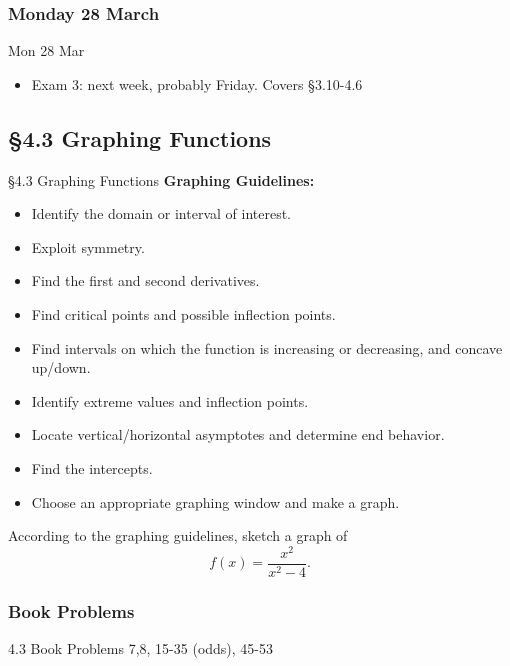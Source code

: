 \documentclass[cal1spr16Lectures.tex]{subfiles}
\begin{document}

\subsubsection{\bf Monday 28 March}

\begin{frame}[allowframebreaks]{Mon 28 Mar}
\begin{itemize}%
\item Exam 3: next week, probably Friday.  Covers \S 3.10-4.6 
\end{itemize}
\end{frame}

\subsection[4.3 Graphing Functions]{\S 4.3 Graphing Functions}

\begin{frame}{\S 4.3 Graphing Functions}
\footnotesize
{\bf Graphing Guidelines:}
\begin{itemize}
\item[1.] Identify the domain or interval of interest.
\item[2.] Exploit symmetry.
\item[3.] Find the first and second derivatives.
\item[4.] Find critical points and possible inflection points.
\item[5.] Find intervals on which the function is increasing or decreasing, and concave up/down.
\item[6.] Identify extreme values and inflection points.
\item[7.] Locate vertical/horizontal asymptotes and determine end behavior.
\item[8.] Find the intercepts.
\item[9.] Choose an appropriate graphing window and make a graph.
\end{itemize}
\end{frame}

\begin{frame}
\begin{exe} According to the graphing guidelines, sketch a graph of 
\[f(x)=\frac{x^2}{x^2-4}.\]
\end{exe}
\end{frame}

\subsubsection{Book Problems}

\begin{frame}
\begin{block}{4.3 Book Problems}
7,8, 15-35 (odds), 45-53 
\end{block}
\end{frame}
\end{document}

